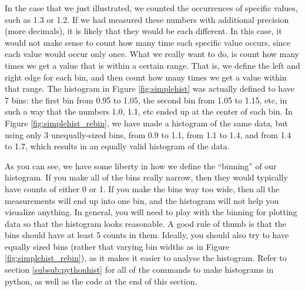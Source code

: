 In the case that we just illustrated, we counted the occurrences of specific values, such as 1.3 or 1.2. If we had measured these numbers with additional precision (more decimals), it is likely that they would be each different. In this case, it would not make sense to count how many time each specific value occurs, since each value would occur only once. What we really want to do, is count how many times we get a value that is within a certain range. That is, we define the left and right edge for each bin, and then count how many times we get a value within that range. The histogram in Figure \ref{fig:simplehist} was actually defined to have 7 bins: the first bin from 0.95 to 1.05, the second bin from 1.05 to 1.15, etc, in such a way that the numbers 1.0, 1.1, etc ended up at the center of each bin. In Figure \ref{fig:simplehist_rebin}, we have made a histogram of the same data, but using only 3 unequally-sized bins, from 0.9 to 1.1, from 1.1 to 1.4, and from 1.4 to 1.7, which results in an equally valid histogram of the data. 
 

As you can see, we have some liberty in how we define the ``binning'' of our histogram. If you make all of the bins really narrow, then they would typically have counts of either 0 or 1. If you make the bins way too wide, then all the measurements will end up into one bin, and the histogram will not help you visualize anything. In general, you will need to play with the binning for plotting data so that the histogram looks reasonable. A good rule of thumb is that the bins should have at least 5 counts in them. Ideally, you should also try to have equally sized bins (rather that varying bin widths as in Figure \ref{fig:simplehist_rebin}), as it makes it easier to analyse the histogram. Refer to section \ref{subsub:pythonhist} for all of the commands to make histograms in python, as well as the code at the end of this section.

